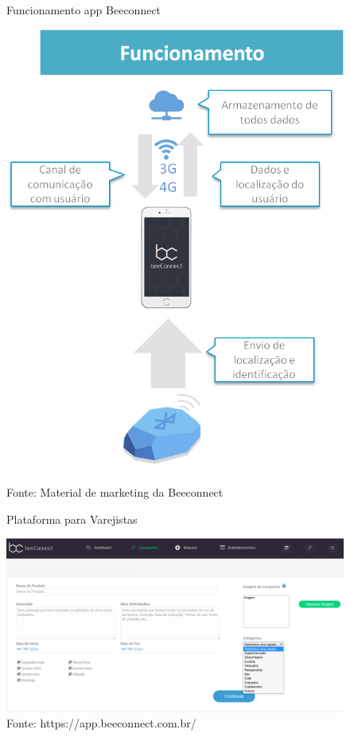 \begin{figure}[H]
\caption{Funcionamento app Beeconnect}
\centerline{\includegraphics[scale=0.75]{img/explicacaoBeeconnect}}
\label{fig:explicacaoBeeconnect}
\caption* {Fonte: Material de marketing da Beeconnect}
\end{figure}

\begin{figure}[H]
\caption{Plataforma para Varejistas}
\centerline{\includegraphics[scale=0.25]{img/plataforma_varejistas}}
\label{fig:plataforma_varejistas}
\caption* {Fonte: https://app.beeconnect.com.br/}
\end{figure}

